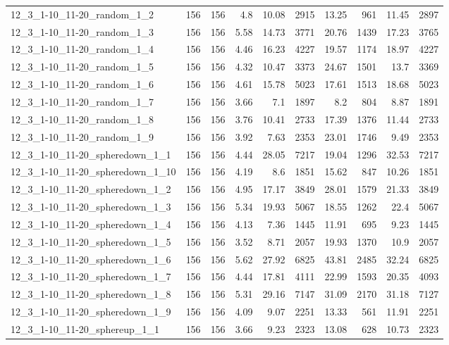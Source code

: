 \begin{center}
\begin{scriptsize}
\begin{longtable}{lrrrrrrrrr}
12\_3\_1-10\_11-20\_random\_1\_2 & 156 & 156 & 4.8 & 10.08 & 2915 & 13.25 & 961 & 11.45 & 2897\\
12\_3\_1-10\_11-20\_random\_1\_3 & 156 & 156 & 5.58 & 14.73 & 3771 & 20.76 & 1439 & 17.23 & 3765\\
12\_3\_1-10\_11-20\_random\_1\_4 & 156 & 156 & 4.46 & 16.23 & 4227 & 19.57 & 1174 & 18.97 & 4227\\
12\_3\_1-10\_11-20\_random\_1\_5 & 156 & 156 & 4.32 & 10.47 & 3373 & 24.67 & 1501 & 13.7 & 3369\\
12\_3\_1-10\_11-20\_random\_1\_6 & 156 & 156 & 4.61 & 15.78 & 5023 & 17.61 & 1513 & 18.68 & 5023\\
12\_3\_1-10\_11-20\_random\_1\_7 & 156 & 156 & 3.66 & 7.1 & 1897 & 8.2 & 804 & 8.87 & 1891\\
12\_3\_1-10\_11-20\_random\_1\_8 & 156 & 156 & 3.76 & 10.41 & 2733 & 17.39 & 1376 & 11.44 & 2733\\
12\_3\_1-10\_11-20\_random\_1\_9 & 156 & 156 & 3.92 & 7.63 & 2353 & 23.01 & 1746 & 9.49 & 2353\\
12\_3\_1-10\_11-20\_spheredown\_1\_1 & 156 & 156 & 4.44 & 28.05 & 7217 & 19.04 & 1296 & 32.53 & 7217\\
12\_3\_1-10\_11-20\_spheredown\_1\_10 & 156 & 156 & 4.19 & 8.6 & 1851 & 15.62 & 847 & 10.26 & 1851\\
12\_3\_1-10\_11-20\_spheredown\_1\_2 & 156 & 156 & 4.95 & 17.17 & 3849 & 28.01 & 1579 & 21.33 & 3849\\
12\_3\_1-10\_11-20\_spheredown\_1\_3 & 156 & 156 & 5.34 & 19.93 & 5067 & 18.55 & 1262 & 22.4 & 5067\\
12\_3\_1-10\_11-20\_spheredown\_1\_4 & 156 & 156 & 4.13 & 7.36 & 1445 & 11.91 & 695 & 9.23 & 1445\\
12\_3\_1-10\_11-20\_spheredown\_1\_5 & 156 & 156 & 3.52 & 8.71 & 2057 & 19.93 & 1370 & 10.9 & 2057\\
12\_3\_1-10\_11-20\_spheredown\_1\_6 & 156 & 156 & 5.62 & 27.92 & 6825 & 43.81 & 2485 & 32.24 & 6825\\
12\_3\_1-10\_11-20\_spheredown\_1\_7 & 156 & 156 & 4.44 & 17.81 & 4111 & 22.99 & 1593 & 20.35 & 4093\\
12\_3\_1-10\_11-20\_spheredown\_1\_8 & 156 & 156 & 5.31 & 29.16 & 7147 & 31.09 & 2170 & 31.18 & 7127\\
12\_3\_1-10\_11-20\_spheredown\_1\_9 & 156 & 156 & 4.09 & 9.07 & 2251 & 13.33 & 561 & 11.91 & 2251\\
12\_3\_1-10\_11-20\_sphereup\_1\_1 & 156 & 156 & 3.66 & 9.23 & 2323 & 13.08 & 628 & 10.73 & 2323\\

\end{longtable}
\end{scriptsize}
\end{center}

